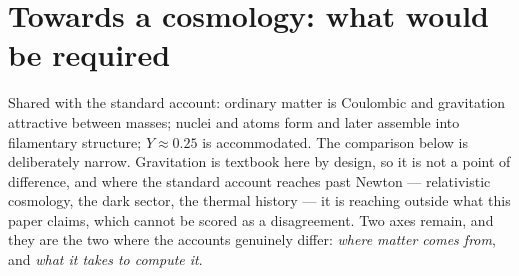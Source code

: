 \documentclass[11pt]{article}
\begin{document}
\section{Towards a cosmology: what would be required}\label{sec:towards}\label{sec:lcdm}
Shared with the standard account: ordinary matter is Coulombic and gravitation attractive between masses; nuclei
and atoms form and later assemble into filamentary structure; $Y\approx0.25$ is accommodated. The comparison below
is deliberately narrow. Gravitation is textbook here by design, so it is not a point of difference, and where the
standard account reaches past Newton --- relativistic cosmology, the dark sector, the thermal history --- it is
reaching outside what this paper claims, which cannot be scored as a disagreement. Two axes remain, and they are
the two where the accounts genuinely differ: \emph{where matter comes from}, and \emph{what it takes to compute
it}.
\end{document}
